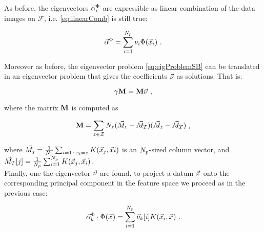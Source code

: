 As before, the eigenvectors $\AAlpha^\Phi_i$ are expressible as linear combination of the data images on $\mathcal{F}$, i.e. \eqref{eq:linearComb} is still true:

\begin{equation}
\AAlpha^\Phi = \sum_{i=1}^{\nbProfilingTraces}\nu_i \Phi(\vLeakVec_{i}) \mbox{ .}
\end{equation}

Moreover as before, the eigenvector problem \eqref{eq:eigProblemSB} can be translated in an eigenvector problem that gives the coefficients $\nununu$ as solutions. That is:

\begin{equation}\label{eq:eigProblemM}
\gamma\MMM = \MMM \nununu \mbox{ ,}
\end{equation}

where the matrix $\MMM$ is computed as

\begin{equation}
\MMM = \sum_{\sensVar\in\sensVarSet}\nbTracesPerClass(\MMMclass - \MMMT)(\MMMclass-\MMMT)\mbox{ ,}
\end{equation}

where $\MMMclass[j] = \frac{1}{\nbTracesPerClass}\sum_{i=1\colon \sensVar_i=\sensVar}K(\vLeakVec_{j},\vLeakVec{i})$ is an $\nbProfilingTraces$-sized column vector, and $\MMMT[j] = \frac{1}{\nbProfilingTraces}\sum_{i=1}^{\nbProfilingTraces}K(\vLeakVec_{j},\vLeakVec_{i})$.\\

Finally, one the eigenvector $\nununu$ are found, to project a datum $\vLeakVec_{}$ onto the corresponding principal component in the feature space we proceed as in the previous case:

\begin{equation} \label{eq:projection}
\AAlpha^\Phi_k \cdot \Phi(\vLeakVec_{}) =  \sum_{i=1}^{\nbProfilingTraces}\nununu_k[i]K(\vLeakVec_{i}, \vLeakVec_{}) \mbox{ .}
\end{equation}
